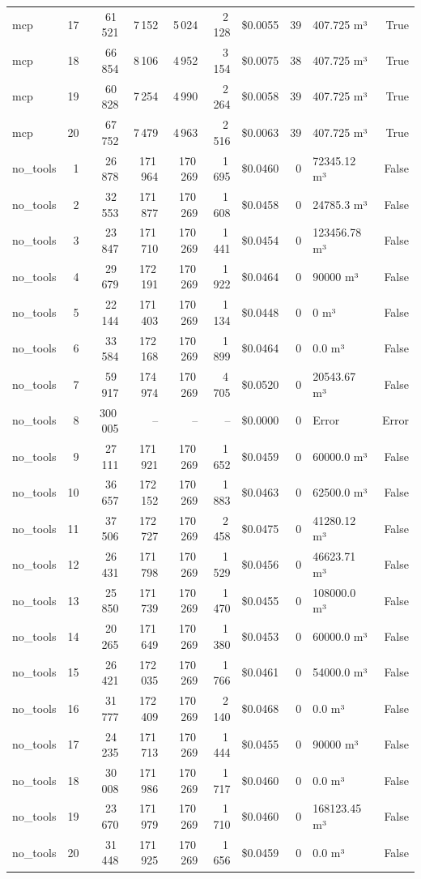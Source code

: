 \documentclass[a4paper,11pt]{article}
\begin{document}
\begin{table}[H]
{\begin{tabular}{l r r r r r r r l r}
mcp & 17 & 61\,521 & 7\,152 & 5\,024 & 2\,128 & \$0.0055 & 39 & 407.725 m³ & True \\
mcp & 18 & 66\,854 & 8\,106 & 4\,952 & 3\,154 & \$0.0075 & 38 & 407.725 m³ & True \\
mcp & 19 & 60\,828 & 7\,254 & 4\,990 & 2\,264 & \$0.0058 & 39 & 407.725 m³ & True \\
mcp & 20 & 67\,752 & 7\,479 & 4\,963 & 2\,516 & \$0.0063 & 39 & 407.725 m³ & True \\
\midrule
no\_tools & 1 & 26\,878 & 171\,964 & 170\,269 & 1\,695 & \$0.0460 & 0 & 72345.12 m³ & False \\
no\_tools & 2 & 32\,553 & 171\,877 & 170\,269 & 1\,608 & \$0.0458 & 0 & 24785.3 m³ & False \\
no\_tools & 3 & 23\,847 & 171\,710 & 170\,269 & 1\,441 & \$0.0454 & 0 & 123456.78 m³ & False \\
no\_tools & 4 & 29\,679 & 172\,191 & 170\,269 & 1\,922 & \$0.0464 & 0 & 90000 m³ & False \\
no\_tools & 5 & 22\,144 & 171\,403 & 170\,269 & 1\,134 & \$0.0448 & 0 & 0 m³ & False \\
no\_tools & 6 & 33\,584 & 172\,168 & 170\,269 & 1\,899 & \$0.0464 & 0 & 0.0 m³ & False \\
no\_tools & 7 & 59\,917 & 174\,974 & 170\,269 & 4\,705 & \$0.0520 & 0 & 20543.67 m³ & False \\
no\_tools & 8 & 300\,005 & -- & -- & -- & \$0.0000 & 0 & Error & Error \\
no\_tools & 9 & 27\,111 & 171\,921 & 170\,269 & 1\,652 & \$0.0459 & 0 & 60000.0 m³ & False \\
no\_tools & 10 & 36\,657 & 172\,152 & 170\,269 & 1\,883 & \$0.0463 & 0 & 62500.0 m³ & False \\
no\_tools & 11 & 37\,506 & 172\,727 & 170\,269 & 2\,458 & \$0.0475 & 0 & 41280.12 m³ & False \\
no\_tools & 12 & 26\,431 & 171\,798 & 170\,269 & 1\,529 & \$0.0456 & 0 & 46623.71 m³ & False \\
no\_tools & 13 & 25\,850 & 171\,739 & 170\,269 & 1\,470 & \$0.0455 & 0 & 108000.0 m³ & False \\
no\_tools & 14 & 20\,265 & 171\,649 & 170\,269 & 1\,380 & \$0.0453 & 0 & 60000.0 m³ & False \\
no\_tools & 15 & 26\,421 & 172\,035 & 170\,269 & 1\,766 & \$0.0461 & 0 & 54000.0 m³ & False \\
no\_tools & 16 & 31\,777 & 172\,409 & 170\,269 & 2\,140 & \$0.0468 & 0 & 0.0 m³ & False \\
no\_tools & 17 & 24\,235 & 171\,713 & 170\,269 & 1\,444 & \$0.0455 & 0 & 90000 m³ & False \\
no\_tools & 18 & 30\,008 & 171\,986 & 170\,269 & 1\,717 & \$0.0460 & 0 & 0.0 m³ & False \\
no\_tools & 19 & 23\,670 & 171\,979 & 170\,269 & 1\,710 & \$0.0460 & 0 & 168123.45 m³ & False \\
no\_tools & 20 & 31\,448 & 171\,925 & 170\,269 & 1\,656 & \$0.0459 & 0 & 0.0 m³ & False \\
\bottomrule
\end{tabular}}
\end{table}
\end{document}
